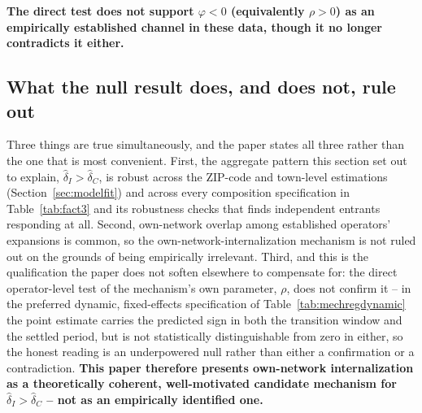 \documentclass[english,12pt]{article}
\begin{document}
\begin{table}[htbp]
\centering\footnotesize

\caption{Own-network-overlap interaction $\varphi$, early (market age $\le3$ quarters) versus late (age $\ge4$ quarters), sparse two-way fixed-effects PPML. Candidate markets restricted to nonlegal- and always-legal-border ZIP codes, the paper's main comparison sample. Standard errors in parentheses, clustered by operator. $^{*}p<.10$ $^{**}p<.05$ $^{***}p<.01$.}
\label{tab:mechregdynamic}
\end{table}

\textbf{The direct test does not support $\varphi<0$ (equivalently $\rho>0$) as an empirically established channel in these data, though it no longer contradicts it either.}

\subsection{What the null result does, and does not, rule out}
\label{sec:mechanism-conclusion}

Three things are true simultaneously, and the paper states all three rather than the one that is most convenient. First, the aggregate pattern this section set out to explain, $\hat\delta_I>\hat\delta_C$, is robust across the ZIP-code and town-level estimations (Section~\ref{sec:modelfit}) and across every composition specification in Table~\ref{tab:fact3} and its robustness checks that finds independent entrants responding at all. Second, own-network overlap among established operators' expansions is common, so the own-network-internalization mechanism is not ruled out on the grounds of being empirically irrelevant. Third, and this is the qualification the paper does not soften elsewhere to compensate for: the direct operator-level test of the mechanism's own parameter, $\rho$, does not confirm it -- in the preferred dynamic, fixed-effects specification of Table~\ref{tab:mechregdynamic} the point estimate carries the predicted sign in both the transition window and the settled period, but is not statistically distinguishable from zero in either, so the honest reading is an underpowered null rather than either a confirmation or a contradiction. \textbf{This paper therefore presents own-network internalization as a theoretically coherent, well-motivated candidate mechanism for $\hat\delta_I>\hat\delta_C$ -- not as an empirically identified one.}
\end{document}
